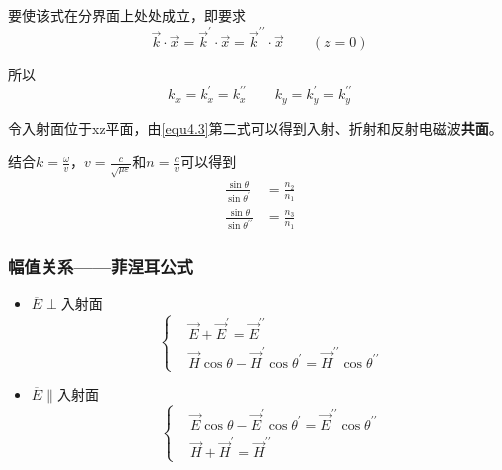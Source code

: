 \documentclass[UTF8]{ctexart}
\begin{document}
\noindent 要使该式在分界面上处处成立，即要求
\begin{equation}
    \vec{k} \cdot \vec{x}=\vec{k}^{\prime} \cdot \vec{x}=\vec{k}^{\prime \prime} \cdot \vec{x} \qquad (z=0)
\end{equation}

\noindent 所以
\begin{equation}
    k_x = k_x^{\prime} = k_x^{\prime \prime} \qquad k_y=k_y^{\prime} = k_y^{\prime \prime} \label{equ4.3}
\end{equation}

\noindent 令入射面位于xz平面，由\autoref{equ4.3}第二式可以得到入射、折射和反射电磁波\textbf{共面}。

    结合$k= \frac{\omega}{v}$，$v = \frac{c}{\sqrt{\mu \varepsilon}}$和$n = \frac{c}{v}$可以得到
    \begin{equation}
        \begin{aligned}
            \frac{\sin \theta}{\sin \theta^{\prime}} &= \frac{n_2}{n_1} \\
            \frac{\sin \theta}{\sin \theta^{\prime \prime}} &=\frac{n_3}{n_1}
        \end{aligned}
    \end{equation}

    \subsubsection{幅值关系——菲涅耳公式}
    \begin{itemize}
        \item $\overline{E} \perp$入射面
        \begin{equation}
            \left \{ \begin{aligned}
                &\vec{E} + \vec{E}^{\prime} = \vec{E}^{\prime \prime} \\
                &\vec{H} \cos \theta - \vec{H}^{\prime} \cos \theta^{\prime} = \vec{H}^{\prime \prime} \cos \theta^{\prime \prime}
            \end{aligned} \right.
        \end{equation}

        \item $\overline{E} \parallel$入射面
        \begin{equation}
            \left \{ \begin{aligned}
                &\vec{E} \cos \theta - \vec{E}^{\prime} \cos \theta^{\prime} = \vec{E}^{\prime \prime} \cos \theta^{\prime \prime} \\
                &\vec{H} + \vec{H}^{\prime} = \vec{H}^{\prime \prime}
            \end{aligned} \right.
        \end{equation}
    \end{itemize}
\end{document}
